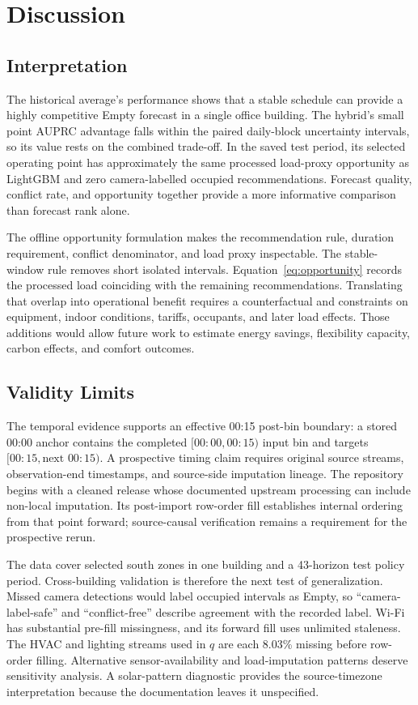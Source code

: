 \section{Discussion}

\subsection{Interpretation}

The historical average's performance shows that a stable schedule can provide a highly competitive Empty forecast in a single office building. The hybrid's small point AUPRC advantage falls within the paired daily-block uncertainty intervals, so its value rests on the combined trade-off. In the saved test period, its selected operating point has approximately the same processed load-proxy opportunity as LightGBM and zero camera-labelled occupied recommendations. Forecast quality, conflict rate, and opportunity together provide a more informative comparison than forecast rank alone.

The offline opportunity formulation makes the recommendation rule, duration requirement, conflict denominator, and load proxy inspectable. The stable-window rule removes short isolated intervals. Equation~\eqref{eq:opportunity} records the processed load coinciding with the remaining recommendations. Translating that overlap into operational benefit requires a counterfactual and constraints on equipment, indoor conditions, tariffs, occupants, and later load effects. Those additions would allow future work to estimate energy savings, flexibility capacity, carbon effects, and comfort outcomes.

\subsection{Validity Limits}

The temporal evidence supports an effective 00:15 post-bin boundary: a stored 00:00 anchor contains the completed $[00{:}00,00{:}15)$ input bin and targets $[00{:}15,\text{next }00{:}15)$. A prospective timing claim requires original source streams, observation-end timestamps, and source-side imputation lineage. The repository begins with a cleaned release whose documented upstream processing can include non-local imputation. Its post-import row-order fill establishes internal ordering from that point forward; source-causal verification remains a requirement for the prospective rerun.

The data cover selected south zones in one building and a 43-horizon test policy period. Cross-building validation is therefore the next test of generalization. Missed camera detections would label occupied intervals as Empty, so ``camera-label-safe'' and ``conflict-free'' describe agreement with the recorded label. Wi-Fi has substantial pre-fill missingness, and its forward fill uses unlimited staleness. The HVAC and lighting streams used in $q$ are each 8.03\% missing before row-order filling. Alternative sensor-availability and load-imputation patterns deserve sensitivity analysis. A solar-pattern diagnostic provides the source-timezone interpretation because the documentation leaves it unspecified.

